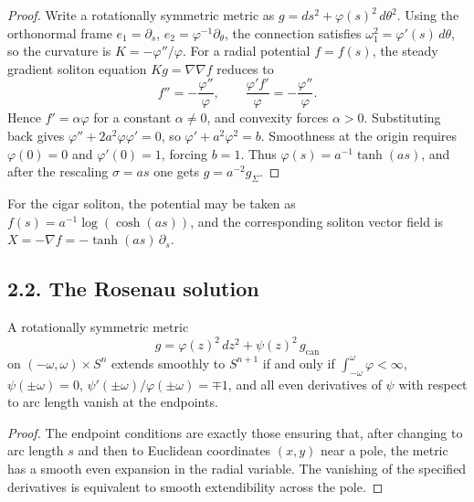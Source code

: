 \begin{proof}
\sketch Write a rotationally symmetric metric as \(g=ds^2+\varphi(s)^2\,d\theta^2\).
Using the orthonormal frame \(e_1=\partial_s\), \(e_2=\varphi^{-1}\partial_\theta\),
the connection satisfies \(\omega^2_1=\varphi'(s)\,d\theta\), so the curvature is
\(K=-\varphi''/\varphi\). For a radial potential \(f=f(s)\), the steady gradient
soliton equation \(Kg=\nabla\nabla f\) reduces to
\[
f''=-\frac{\varphi''}{\varphi},\qquad
\frac{\varphi' f'}{\varphi}=-\frac{\varphi''}{\varphi}.
\]
Hence \(f'=\alpha\varphi\) for a constant \(\alpha\neq 0\), and convexity forces
\(\alpha>0\). Substituting back gives \(\varphi''+2a^2\varphi\varphi'=0\), so
\(\varphi'+a^2\varphi^2=b\). Smoothness at the origin requires
\(\varphi(0)=0\) and \(\varphi'(0)=1\), forcing \(b=1\). Thus
\(\varphi(s)=a^{-1}\tanh(as)\), and after the rescaling \(\sigma=as\) one gets
\(g=a^{-2}g_\Sigma\).
\end{proof}

\begin{remark}
\label{ch02-rem-cigars-potential}

For the cigar soliton, the potential may be taken as
\(f(s)=a^{-1}\log(\cosh(as))\), and the corresponding soliton vector field is
\(X=-\nabla f=-\tanh(as)\,\partial_s\).
\end{remark}

\subsection*{2.2. The Rosenau solution}

\begin{lemma}
\label{ch02-lem-cylinder-to-sphere}

A rotationally symmetric metric
\[
g=\varphi(z)^2\,dz^2+\psi(z)^2\,g_{\mathrm{can}}
\]
on \((-\omega,\omega)\times S^n\) extends smoothly to \(S^{n+1}\) if and only if
\(\int_{-\omega}^{\omega}\varphi<\infty\), \(\psi(\pm\omega)=0\),
\(\psi'(\pm\omega)/\varphi(\pm\omega)=\mp 1\), and all even derivatives of
\(\psi\) with respect to arc length vanish at the endpoints.
\end{lemma}

\begin{proof}
\sketch The endpoint conditions are exactly those ensuring that, after changing to arc
length \(s\) and then to Euclidean coordinates \((x,y)\) near a pole, the metric
has a smooth even expansion in the radial variable. The vanishing of the
specified derivatives is equivalent to smooth extendibility across the pole.
\end{proof}

